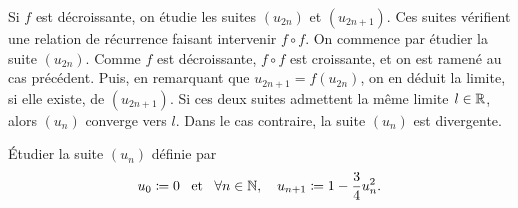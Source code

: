 \documentclass{magnolia}
\begin{document}
\begin{remarqueUnique}
\remarque Si $f$ est décroissante, on étudie les
      suites $(u_{2n})$ et $(u_{2n+1})$. Ces suites vérifient une relation de
      récurrence faisant intervenir $f\circ f$. On commence par étudier la suite $(u_{2n})$. Comme $f$ est décroissante, $f\circ f$ est croissante, et on est ramené au cas précédent. Puis, en remarquant que $u_{2n+1}=f(u_{2n})$, on en déduit la limite, si elle existe, de $(u_{2n+1})$. Si ces deux suites
      admettent la même limite $l\in\mathbb{R}$, alors $(u_n)$ converge vers $l$. Dans
      le cas contraire, la suite $(u_n)$ est divergente.
\end{remarqueUnique}


\begin{exoUnique}
\exo Étudier la suite $(u_n)$ définie par
\[u_0\coloneqq 0\quad\!\text{et}\quad\!\forall n\in\mathbb{N},\quad u_{n+1}\coloneqq 1-\frac{3}{4}u_n^2.\]
\begin{center}
\end{center}
\end{exoUnique}
\end{document}
